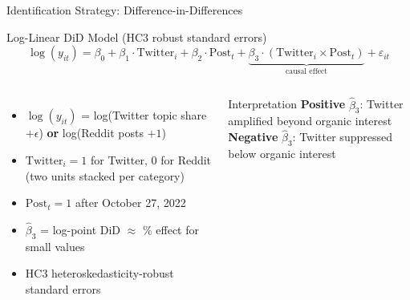 \documentclass[aspectratio=169]{beamer}
\begin{document}
\begin{frame}{Identification Strategy: Difference-in-Differences}

\begin{block}{Log-Linear DiD Model (HC3 robust standard errors)}
\[
\log(y_{it}) = \beta_0 + \beta_1 \cdot \text{Twitter}_i + \beta_2 \cdot \text{Post}_t + \underbrace{\beta_3 \cdot (\text{Twitter}_i \times \text{Post}_t)}_{\text{causal effect}} + \varepsilon_{it}
\]
\end{block}

\vspace{0.4em}
\begin{columns}[t]
    \begin{itemize}
        \item $\log(y_{it})$ = log(Twitter topic share $+ \epsilon$) \textbf{or} log(Reddit posts $+ 1$)
        \item $\text{Twitter}_i = 1$ for Twitter, 0 for Reddit (two units stacked per category)
        \item $\text{Post}_t = 1$ after October 27, 2022
        \item $\hat{\beta}_3$ = log-point DiD $\approx$ \% effect for small values
        \item HC3 heteroskedasticity-robust standard errors
    \end{itemize}

    \begin{alertblock}{Interpretation}
    \textbf{Positive} $\hat{\beta}_3$: Twitter amplified beyond organic interest\\[0.4em]
    \textbf{Negative} $\hat{\beta}_3$: Twitter suppressed below organic interest
    \end{alertblock}
\end{columns}
\end{frame}
\end{document}
